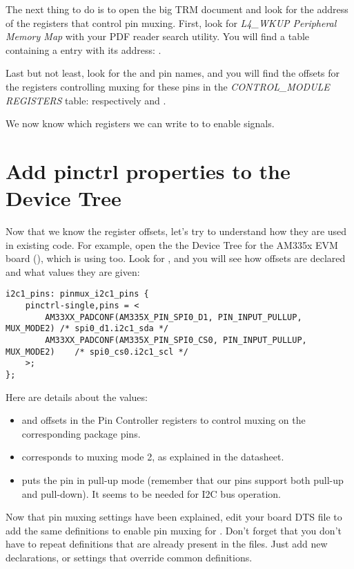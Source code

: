 The next thing to do is to open the big TRM document and look for the
address of the registers that control pin muxing. First, look for
{\em L4\_WKUP Peripheral Memory Map} with your PDF reader search
utility. You will find a table containing a
 entry with its address:
.

Last but not least, look for the  and 
pin names, and you will find the offsets for the registers controlling
muxing for these pins in the {\em CONTROL\_MODULE REGISTERS} table:
respectively  and .

We now know which registers we can write to to enable 
signals.

\section{Add pinctrl properties to the Device Tree}

Now that we know the register offsets, let's try to understand
how they are used in existing code. For example, open the
the Device Tree for the AM335x EVM board
(), which is using
 too. Look for , and you will see how
offsets are declared and what values they are given:

{\small
\begin{verbatim}
i2c1_pins: pinmux_i2c1_pins {
	pinctrl-single,pins = <
		AM33XX_PADCONF(AM335X_PIN_SPI0_D1, PIN_INPUT_PULLUP, MUX_MODE2)	/* spi0_d1.i2c1_sda */
		AM33XX_PADCONF(AM335X_PIN_SPI0_CS0, PIN_INPUT_PULLUP, MUX_MODE2)	/* spi0_cs0.i2c1_scl */
	>;
};
\end{verbatim}
}

Here are details about the values:

\begin{itemize}
\item {} and  offsets
      in the Pin Controller registers to control muxing on the
      corresponding package pins.
\item {} corresponds to muxing mode 2, as explained in the
      datasheet.
\item {} puts the pin in pull-up mode (remember
      that our pins support both pull-up and pull-down). It seems to
      be needed for I2C bus operation.
\end{itemize}

Now that pin muxing settings have been explained, edit your board
DTS file to add the same definitions to enable pin muxing for .
Don't forget that you don't have to repeat definitions that are
already present in the  files. Just add new declarations, or
settings that override common definitions.

